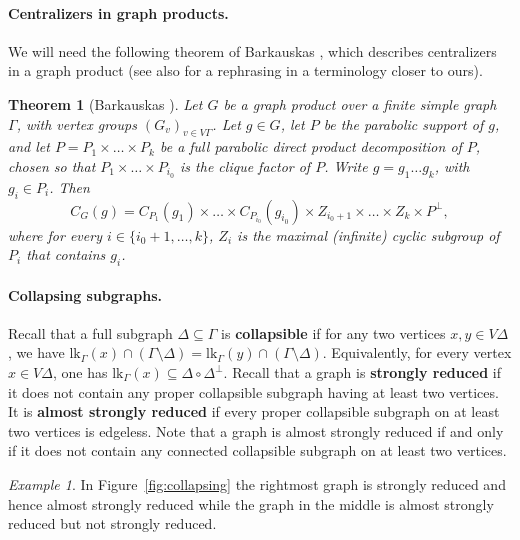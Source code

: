 \documentclass[a4paper,english,11pt]{article}
\newtheorem{theo}[de]{Theorem}
\theoremstyle{definition}
\theoremstyle{remark}
\newtheorem{ex}[de]{Example}
\newcommand{\lk}{\mathrm{lk}}
\newcommand{\deffont}[1]{\textbf{#1}}
\begin{document}
\paragraph*{Centralizers in graph products.} We will need the following theorem of Barkauskas \cite{Bar}, which describes centralizers in a graph product (see also \cite[Proposition~2.6]{Gen} for a rephrasing in a terminology closer to ours).

\begin{theo}[Barkauskas \cite{Bar}] \label{theo:barkauskas}
{Let $G$ be a graph product over a finite simple graph~$\Gamma$, with vertex groups $(G_v)_{v\in V\Gamma}$. Let $g\in G$, let $P$ be the parabolic support of $g$, and let $P=P_1\times\dots\times P_k$ be a full parabolic direct product decomposition of $P$, chosen so that $P_1\times\dots\times P_{i_0}$ is the clique factor of $P$. Write $g=g_1\dots g_k$, with $g_i\in P_i$. Then 
\begin{equation*}
    C_G(g)=C_{P_1}(g_1)\times\dots\times C_{P_{i_0}}(g_{i_0})\times Z_{i_0+1}\times\dots\times Z_k\times P^\perp,
\end{equation*}
where for every $i\in\{i_0+1,\dots,k\}$, $Z_i$ is the maximal (infinite) cyclic subgroup of $P_i$ that contains $g_i$.}  
\end{theo}

\paragraph{Collapsing subgraphs.} Recall that a full subgraph $\Delta\subseteq\Gamma$ is \deffont{collapsible} if for any two vertices $x,y\in V\Delta$, we have $\lk_\Gamma(x)\cap (\Gamma\setminus\Delta)=\lk_\Gamma(y)\cap (\Gamma\setminus\Delta)$. Equivalently, for every vertex $x\in V\Delta$, one has $\lk_\Gamma(x)\subseteq \Delta\circ\Delta^{\perp}$. Recall that a graph is \deffont{strongly reduced} if it does not contain any proper collapsible subgraph having at least two vertices. It is \deffont{almost strongly reduced} if every proper collapsible subgraph on at
least two vertices is edgeless. Note that a graph is almost strongly reduced if and only if it does not contain any connected collapsible subgraph on at least two vertices.

\begin{ex} In Figure~\ref{fig:collapsing} the rightmost graph is strongly reduced and hence almost strongly reduced while the graph in the middle is almost strongly reduced but not strongly reduced.  
\end{ex}
\end{document}
